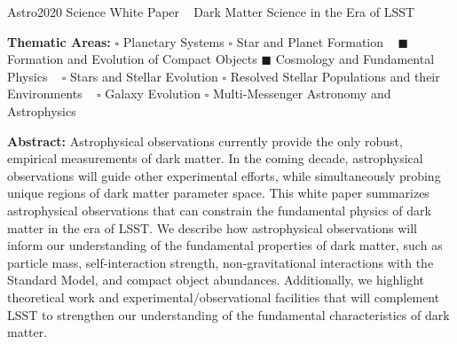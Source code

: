\documentclass[12pt]{article}
\begin{document}
\begin{raggedright} 
\huge
Astro2020 Science White Paper \hfill ~ \linebreak
Dark Matter Science in the Era of LSST \hfill ~ \linebreak
\end{raggedright}
\normalsize

\noindent \textbf{Thematic Areas:} \hspace*{58pt} $\square$ Planetary Systems \hspace*{12pt} $\square$ Star and Planet Formation  \hfill ~\linebreak
$\blacksquare$ Formation and Evolution of Compact Objects \hspace*{31pt} $\blacksquare$ Cosmology and Fundamental Physics \hfill ~ \linebreak
  $\square$  Stars and Stellar Evolution \hspace*{1pt} $\square$ Resolved Stellar Populations and their Environments \hspace*{40pt} \hfill ~\linebreak
  $\square$    Galaxy Evolution   \hspace*{45pt} $\square$             Multi-Messenger Astronomy and Astrophysics \hspace*{65pt} \hfill ~ \linebreak



\noindent \textbf{Abstract:}
Astrophysical observations currently provide the only robust, empirical measurements of dark matter. 
In the coming decade, astrophysical observations will guide other experimental efforts, while simultaneously probing unique regions of dark matter parameter space.
This white paper summarizes astrophysical observations that can constrain the fundamental physics of dark matter in the era of LSST. 
We describe how astrophysical observations will inform our understanding of the fundamental properties of dark matter, such as particle mass, self-interaction strength, non-gravitational interactions with the Standard Model, and compact object abundances. Additionally, we highlight theoretical work and experimental/observational facilities that will complement LSST to strengthen our understanding of the fundamental characteristics of dark matter.
\end{document}
